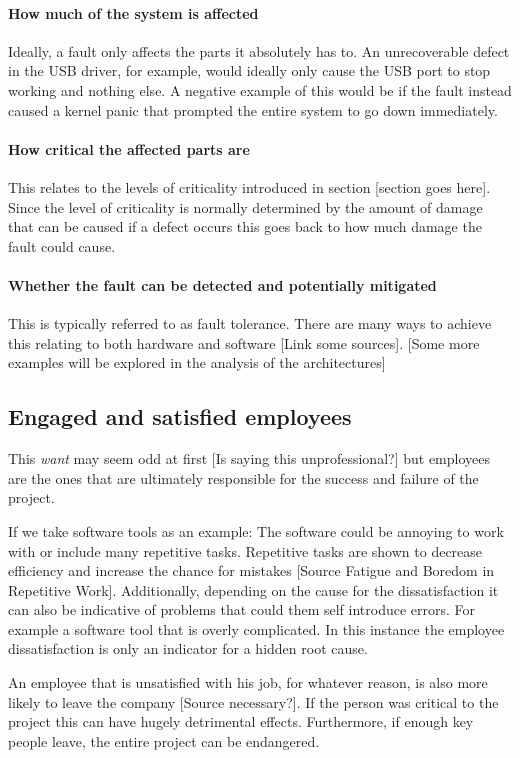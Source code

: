 \paragraph{How much of the system is affected}
Ideally,  a fault only affects the parts it absolutely has to. An unrecoverable defect in the USB driver, for example, would ideally only cause the USB port to stop working and nothing else. A negative example of this would be if the fault instead caused a kernel panic that prompted the entire system to go down immediately.
\paragraph{How critical the affected parts are}
This relates to the levels of criticality introduced in section [section goes here]. Since the level of criticality is normally determined by the amount of damage that can be caused if a defect occurs this goes back to how much damage the fault could cause. 
\paragraph{Whether the fault can be detected and potentially mitigated}
This is typically referred to as fault tolerance. There are many ways to achieve this relating to both hardware and software [Link some sources]. [Some more examples will be explored in the analysis of the architectures]

\subsection{Engaged and satisfied employees}
This \textit{want} may seem odd at first [Is saying this unprofessional?] but employees are the ones that are ultimately responsible for the success and failure of the project.

If we take software tools as an example: The software could be annoying to work with or include many repetitive tasks. Repetitive tasks are shown to decrease efficiency and increase the chance for mistakes [Source Fatigue and Boredom in Repetitive Work]. Additionally, depending on the cause for the dissatisfaction it can also be indicative of problems that could them self introduce errors. For example a software tool that is overly complicated. In this instance the employee dissatisfaction is only an indicator for a hidden root cause.

An employee that is unsatisfied with his job, for whatever reason, is also more likely to leave the company [Source necessary?]. If the person was critical to the project this can have hugely detrimental effects. Furthermore, if enough key people leave, the entire project can be endangered. 
